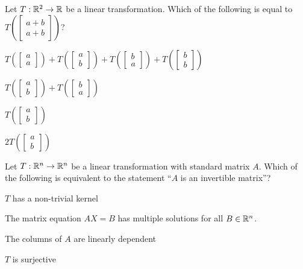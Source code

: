 \documentclass{article}
\begin{document}
\begin{readinessAssuranceTest}
\item Let $T: \mathbb{R}^2 \rightarrow \mathbb{R}$ be a linear transformation.  Which of the following is equal to $T\left(\begin{bmatrix} a+b \\ a+b \end{bmatrix}\right)$?
\begin{multicols}{2}
\begin{readinessAssuranceTestChoices}
\item $T\left(\begin{bmatrix} a \\ a \end{bmatrix}\right)+T\left(\begin{bmatrix}a \\ b \end{bmatrix} \right)+T\left(\begin{bmatrix}b \\ a \end{bmatrix}\right)+T\left(\begin{bmatrix}b \\ b \end{bmatrix} \right)$ %
\item $T\left(\begin{bmatrix}a \\ b \end{bmatrix} \right)+T\left(\begin{bmatrix}b \\ a \end{bmatrix} \right)$
\item $T\left(\begin{bmatrix}a \\ b \end{bmatrix} \right)$
\item $2T\left(\begin{bmatrix}a \\ b \end{bmatrix} \right)$
\end{readinessAssuranceTestChoices}
\end{multicols}

\item Let $T: \mathbb{R}^n \rightarrow \mathbb{R}^n$ be a linear transformation with standard matrix $A$.  Which of the following is equivalent to the statement ``$A$ is an invertible matrix''?
\begin{readinessAssuranceTestChoices}
\item $T$ has a non-trivial kernel
\item The matrix equation $AX=B$ has multiple solutions for all ${B} \in \mathbb{R}^n$.
\item The columns of $A$ are linearly dependent
\item $T$ is surjective %
\end{readinessAssuranceTestChoices}


\end{readinessAssuranceTest}
\end{document}
